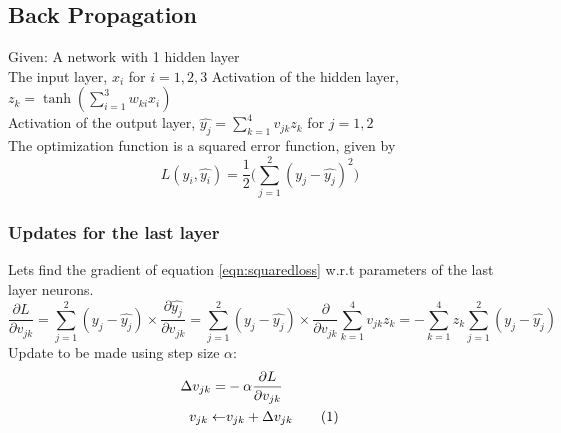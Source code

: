 \documentclass[a4paper,doc,notimes]{article}
\newcommand\numberthis{\addtocounter{equation}{1}\tag{\theequation}}
\begin{document}
\subsection{Back Propagation}
Given: A network with 1 hidden layer\\
The input layer, $x_i$ for $i=1,2,3$
Activation of the hidden layer, $z_k = \tanh(\sum_{i=1}^{3} w_{ki}x_i)$ \\
Activation of the output layer, $\hat{y_j} = \sum_{k=1}^{4} v_{jk}z_k$ for $j = 1, 2$ \\
The optimization function is a squared error function, given by
\begin{equation} \label{eqn:squaredloss}
	L(y_i, \hat{y_i}) = \frac{1}{2} \big( \sum_{j=1}^{2}(y_j - \hat{y_j})^2 \big) 
\end{equation}

\subsubsection{Updates for the last layer}
Lets find the gradient of equation \ref{eqn:squaredloss} w.r.t parameters of the last layer neurons.
\begin{equation}
 \frac{\partial L}{\partial v_{jk}} = \sum_{j=1}^{2}(y_j - \hat{y_j}) \times \frac{\partial \hat{y_j}}{\partial v_{jk}} = \sum_{j=1}^{2}(y_j - \hat{y_j}) \times \frac{\partial }{\partial v_{jk}} \sum_{k=1}^{4} v_{jk}z_k  = - \sum_{k=1}^{4} z_k \sum_{j=1}^{2}(y_j - \hat{y_j}) 
\end{equation}
Update to be made using step size $\alpha$: 
\begin{align*}
 \Delta v_{jk}  = & - \alpha \frac{\partial L}{\partial v_{jk}}  \\
 v_{jk} \leftarrow &  v_{jk}  + \Delta v_{jk} \numberthis
\end{align*}
\end{document}
